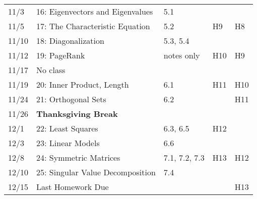 \documentclass[11pt]{article}
\begin{document}
\begin{centering}
\begin{tabular}{||l|p{3in}|l|l|l||}
11/3 & 16: Eigenvectors and Eigenvalues  &  5.1 &  &\\ 
11/5 & 17: The Characteristic Equation  & 5.2 & H9 & H8\\ 
\hline

11/10 & 18: Diagonalization  & 5.3, 5.4 &  &\\  %
11/12 & 19: PageRank  & notes only & H10 & H9\\
\hline

11/17 & No class &  & &\\ 
11/19 & 20: Inner Product, Length   & 6.1 & H11 & H10\\ 
 \hline

11/24 &21: Orthogonal Sets & 6.2 &  &{\color{red}H11} \\ 
11/26 & \textbf{Thanksgiving Break} && &\\
\hline 

12/1 & 22: Least Squares   & 6.3, 6.5 & H12 & \\ 
12/3 & 23: Linear Models  & 6.6 &  &\\ 
\hline  
 12/8 & 24: Symmetric Matrices  &7.1, 7.2, 7.3 & H13 & H12\\
12/10 & 25: Singular Value Decomposition  & 7.4 &  &\\ 
\hline
12/15 & Last Homework Due && & H13 \\
\hline\hline


\end{tabular}\\
\end{centering}
\end{document}
